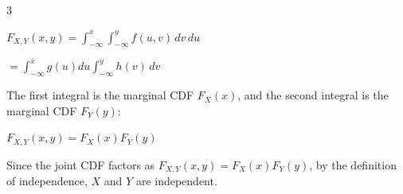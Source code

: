 \documentclass[12 pt]{article}
\begin{document}
\begin{exercise}{3}
    \hfill

    $F_{X,Y}(x,y) = \int_{-\infty}^{x} \int_{-\infty}^{y} f(u,v) \, dv \, du$

    $= \int_{-\infty}^{x} g(u) du \int_{-\infty}^{y} h(v) \,dv$

    The first integral is the marginal CDF $F_X(x)$, and the second integral is the marginal CDF $F_Y(y)$:

    $F_{X,Y}(x,y) = F_X(x) F_Y(y)$

    \hfill

    Since the joint CDF factors as $F_{X,Y}(x,y) = F_X(x) F_Y(y)$, by the definition of independence, $X$ and $Y$ are independent.

    \hfill
    \end{exercise}
\end{document}
